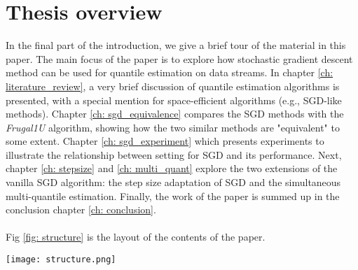 \section{Thesis overview}
\label{sec: intro_overview}
In the final part of the introduction, we give a brief tour of the material in this paper.
The main focus of the paper is to explore how stochastic gradient descent method can be used for quantile estimation on data streams.
In chapter \ref{ch: literature_review}, a very brief discussion of quantile estimation algorithms is presented, with a special mention for space-efficient algorithms (e.g., SGD-like methods). 
Chapter \ref{ch: sgd_equivalence} compares the SGD methods with the \textit{Frugal1U} algorithm\cite{maFrugalStreamingEstimating2014}, showing how the two similar methods are "equivalent" to some extent.
Chapter \ref{ch: sgd_experiment} which presents experiments to illustrate the relationship between setting for SGD and its performance.
Next, chapter \ref{ch: stepsize} and \ref{ch: multi_quant} explore the two extensions of the vanilla SGD algorithm: the step size adaptation of SGD and the simultaneous multi-quantile estimation. Finally, the work of the paper is summed up in the conclusion chapter \ref{ch: conclusion}.
\\\\
Fig \ref{fig: structure} is the layout of the contents of the paper.

\begin{figure*}[h!]
    \centering
	\texttt{[image: structure.png]}
    \caption{The relationship between topics covered in the thesis. Topics are roughly positioned along the top-bottom axis depending on where they are more close to SGD methods (left) or non-SGD methods (right). The arrows between the chapters represent are connected according to dependence.}
    \label{fig: structure}
\end{figure*}
